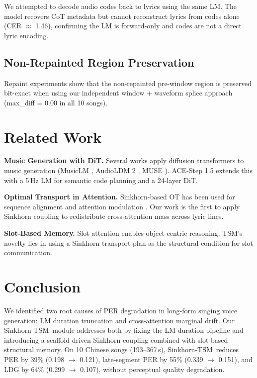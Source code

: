 \documentclass[11pt,a4paper]{article}
\newcommand{\method}{Sinkhorn-TSM}
\begin{document}
We attempted to decode audio codes back to lyrics using the same LM. The model recovers CoT metadata but cannot reconstruct lyrics from codes alone (CER $\approx$ 1.46), confirming the LM is forward-only and codes are not a direct lyric encoding.

\subsection{Non-Repainted Region Preservation}

Repaint experiments show that the non-repainted pre-window region is preserved bit-exact when using our independent window + waveform splice approach (max\_diff = 0.00 in all 10 songs).

\section{Related Work}
\label{sec:related}

\textbf{Music Generation with DiT.} Several works apply diffusion transformers to music generation (MusicLM \cite{musiclm}, AudioLDM 2 \cite{audioldm2}, MUSE \cite{muse}). ACE-Step 1.5 extends this with a 5\,Hz LM for semantic code planning and a 24-layer DiT.

\textbf{Optimal Transport in Attention.} Sinkhorn-based OT has been used for sequence alignment and attention modulation \cite{sinkhorn_transformer, ot_attention}. Our work is the first to apply Sinkhorn coupling to redistribute cross-attention mass across lyric lines.

\textbf{Slot-Based Memory.} Slot attention \cite{slot_attention} enables object-centric reasoning. TSM's novelty lies in using a Sinkhorn transport plan as the structural condition for slot communication.

\section{Conclusion}
\label{sec:conclusion}

We identified two root causes of PER degradation in long-form singing voice generation: LM duration truncation and cross-attention marginal drift. Our \method~module addresses both by fixing the LM duration pipeline and introducing a scaffold-driven Sinkhorn coupling combined with slot-based structural memory. On 10 Chinese songs (193--367\,s), \method~reduces PER by 39\% (0.198 $\to$ 0.121), late-segment PER by 55\% (0.339 $\to$ 0.151), and LDG by 64\% (0.299 $\to$ 0.107), without perceptual quality degradation.
\end{document}
